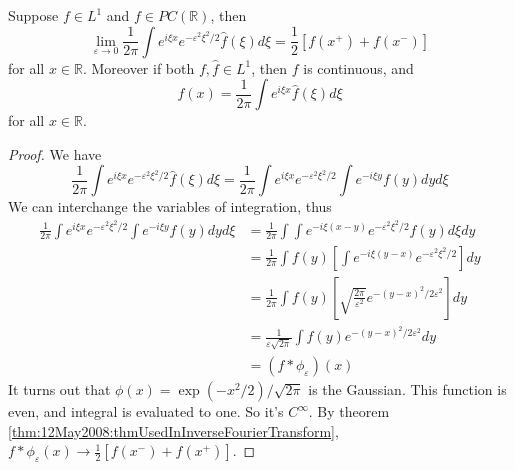 \begin{invFourier}
Suppose $f\in L^{1}$ and $f\in PC(\mathbb{R})$, then
\begin{equation}
\lim_{\varepsilon\to0}\frac{1}{2\pi}\int e^{i\xi x}e^{-\varepsilon^2\xi^2/2}\widehat{f}(\xi)d\xi=\frac{1}{2}\left[f(x^+)+f(x^-)\right]
\end{equation}
for all $x\in\mathbb{R}$. Moreover if both $f,\widehat{f}\in
L^{1}$, then $f$ is continuous, and
\begin{equation}
f(x) = \frac{1}{2\pi}\int e^{i\xi x}\widehat{f}(\xi)d\xi
\end{equation}
for all $x\in\mathbb{R}$.
\end{invFourier}
\begin{proof}
We have
\begin{equation}
\frac{1}{2\pi}\int e^{i\xi x}e^{-\varepsilon^2\xi^2/2}\widehat{f}(\xi)d\xi = \frac{1}{2\pi}\int e^{i\xi x}e^{-\varepsilon^{2}\xi^2/2}\int e^{-i\xi y}f(y)dyd\xi
\end{equation}
We can interchange the variables of integration, thus
\begin{align*}
\frac{1}{2\pi}\int e^{i\xi x}e^{-\varepsilon^{2}\xi^2/2}\int e^{-i\xi y}f(y)dyd\xi
&= \frac{1}{2\pi}\int\int e^{-i\xi(x-y)}e^{-\varepsilon^2\xi^2/2}f(y)d\xi dy\\
&= \frac{1}{2\pi}\int f(y)\left[\int e^{-i\xi(y-x)}e^{-\varepsilon^{2}\xi^2/2} \right]dy\\
&= \frac{1}{2\pi}\int f(y)\left[\sqrt{\frac{2\pi}{\varepsilon^2}}e^{-(y-x)^2/2\varepsilon^2}\right]dy\\
&= \frac{1}{\varepsilon\sqrt{2\pi}}\int f(y)e^{-(y-x)^{2}/2\varepsilon^2}dy\\
&=(f*\phi_{\varepsilon})(x)
\end{align*}
It turns out that $\phi(x) = \exp(-x^2/2)/\sqrt{2\pi}$ is
the Gaussian. This function is even, and integral is
evaluated to one. So it's $C^\infty$. By theorem \eqref{thm:12May2008:thmUsedInInverseFourierTransform},
$f*\phi_{\varepsilon}(x)\to\frac{1}{2}[f(x^-)+f(x^+)]$.


\end{proof}
